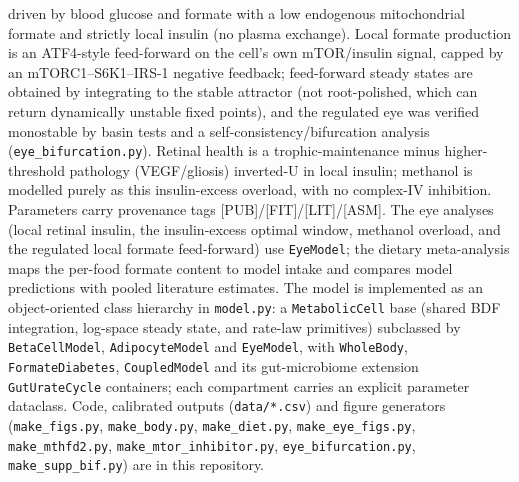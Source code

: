 \documentclass[10pt,letterpaper]{article}
\begin{document}
driven by blood glucose and formate with a low endogenous mitochondrial formate
and strictly local insulin (no plasma exchange). Local formate production is an
ATF4-style feed-forward on the cell's own mTOR/insulin signal, capped by an
mTORC1--S6K1--IRS-1 negative feedback; feed-forward steady states are obtained by
integrating to the stable attractor (not root-polished, which can return
dynamically unstable fixed points), and the regulated eye was verified monostable
by basin tests and a self-consistency/bifurcation analysis
(\texttt{eye\_bifurcation.py}). Retinal health is a trophic-maintenance minus
higher-threshold pathology (VEGF/gliosis) inverted-U in local insulin; methanol is
modelled purely as this insulin-excess overload, with no complex-IV inhibition.
Parameters carry provenance tags [PUB]/[FIT]/[LIT]/[ASM]. The eye analyses (local
retinal insulin, the insulin-excess optimal window, methanol overload, and the
regulated local formate feed-forward) use \texttt{EyeModel}; the dietary
meta-analysis maps the
per-food formate content to model intake and compares model predictions with
pooled literature estimates. The model is implemented as an object-oriented class
hierarchy in \texttt{model.py}: a \texttt{MetabolicCell} base (shared BDF
integration, log-space steady state, and rate-law primitives) subclassed by
\texttt{BetaCellModel}, \texttt{AdipocyteModel} and \texttt{EyeModel}, with
\texttt{WholeBody}, \texttt{FormateDiabetes}, \texttt{CoupledModel} and its gut-microbiome extension \texttt{GutUrateCycle} containers;
each compartment carries an explicit parameter dataclass. Code, calibrated outputs
(\texttt{data/*.csv}) and figure generators (\texttt{make\_figs.py},
\texttt{make\_body.py}, \texttt{make\_diet.py}, \texttt{make\_eye\_figs.py},
\texttt{make\_mthfd2.py}, \texttt{make\_mtor\_inhibitor.py},
\texttt{eye\_bifurcation.py}, \texttt{make\_supp\_bif.py}) are in this repository.
\end{document}
